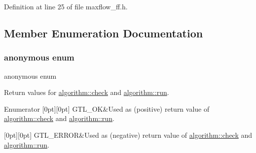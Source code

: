 Definition at line 25 of file maxflow\+\_\+ff.\+h.



\subsection{Member Enumeration Documentation}
\mbox{\label{classalgorithm_af1a0078e153aa99c24f9bdf0d97f6710}} 
\subsubsection{\texorpdfstring{anonymous enum}{anonymous enum}}
{\footnotesize\ttfamily anonymous enum\hspace{0.3cm}{\ttfamily [inherited]}}



Return values for \mbox{\hyperlink{classalgorithm_a76361fb03ad1cf643affc51821e43bed}{algorithm\+::check}} and \mbox{\hyperlink{classalgorithm_a734b189509a8d6b56b65f8ff772d43ca}{algorithm\+::run}}. 

\begin{DoxyEnumFields}{Enumerator}
[0pt][0pt]{}\mbox{\label{classalgorithm_af1a0078e153aa99c24f9bdf0d97f6710a5114c20e4a96a76b5de9f28bf15e282b}} 
G\+T\+L\+\_\+\+OK&Used as (positive) return value of \mbox{\hyperlink{classalgorithm_a76361fb03ad1cf643affc51821e43bed}{algorithm\+::check}} and \mbox{\hyperlink{classalgorithm_a734b189509a8d6b56b65f8ff772d43ca}{algorithm\+::run}}. \\
\hline

[0pt][0pt]{}\mbox{\label{classalgorithm_af1a0078e153aa99c24f9bdf0d97f6710a6fcf574690bbd6cf710837a169510dd7}} 
G\+T\+L\+\_\+\+E\+R\+R\+OR&Used as (negative) return value of \mbox{\hyperlink{classalgorithm_a76361fb03ad1cf643affc51821e43bed}{algorithm\+::check}} and \mbox{\hyperlink{classalgorithm_a734b189509a8d6b56b65f8ff772d43ca}{algorithm\+::run}}. \\
\hline

\end{DoxyEnumFields}


